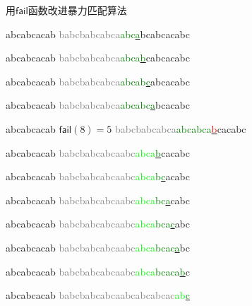 \documentclass{ctexbeamer}
\newcommand{\red}[1]{\textcolor{red}{#1}}
\newcommand{\green}[1]{\textcolor{green}{#1}}
\newcommand{\gray}[1]{\textcolor{gray}{#1}}
\newcommand{\lime}[1]{\textcolor{lime}{#1}}
\newcommand{\fail}{\mathsf{fail}}
\newcommand{\ugrn}[1]{\underline{\green{#1}}}
\newcommand{\ured}[1]{\underline{\red{#1}}}
\begin{document}
\begin{frame}[fragile]{用$\fail$函数改进暴力匹配算法}
\begin{minipage}[t]{0.33\textwidth}
\begin{tverb}[fontsize=\tiny]
            abcabcacab
\gray{babcbabcabca}\green{abc}\ugrn{a}bcabcacabc
\end{tverb}

\begin{tverb}[fontsize=\tiny]
            abcabcacab
\gray{babcbabcabca}\green{abca}\ugrn{b}cabcacabc
\end{tverb}

\begin{tverb}[fontsize=\tiny]
            abcabcacab
\gray{babcbabcabca}\green{abcab}\ugrn{c}abcacabc
\end{tverb}

\begin{tverb}[fontsize=\tiny]
            abcabcacab
\gray{babcbabcabca}\green{abcabc}\ugrn{a}bcacabc
\end{tverb}

\begin{tverb}[fontsize=\tiny]
            abcabcacab \(\scriptstyle\fail(8)=5\)
\gray{babcbabcabca}\green{abcabca}\ured{b}cacabc
\end{tverb}

\begin{tverb}[fontsize=\tiny]
               abcabcacab
\gray{babcbabcabcaabc}\lime{abca}\ugrn{b}cacabc
\end{tverb}

\end{minipage}%
%
\begin{minipage}[t]{.33\textwidth}

\begin{tverb}[fontsize=\tiny]
               abcabcacab
\gray{babcbabcabcaabc}\lime{abca}\green{b}\ugrn{c}acabc
\end{tverb}

\begin{tverb}[fontsize=\tiny]
               abcabcacab
\gray{babcbabcabcaabc}\lime{abca}\green{bc}\ugrn{a}cabc
\end{tverb}

\begin{tverb}[fontsize=\tiny]
               abcabcacab
\gray{babcbabcabcaabc}\lime{abca}\green{bca}\ugrn{c}abc
\end{tverb}

\begin{tverb}[fontsize=\tiny]
               abcabcacab
\gray{babcbabcabcaabc}\lime{abca}\green{bcac}\ugrn{a}bc
\end{tverb}

\begin{tverb}[fontsize=\tiny]
               abcabcacab
\gray{babcbabcabcaabc}\lime{abca}\green{bcaca}\ugrn{b}c
\end{tverb}

\begin{tverb}[fontsize=\tiny]
                       abcabcacab
\gray{babcbabcabcaabcabcabcac}\lime{ab}\ugrn{c}
\end{tverb}
\end{minipage}

\end{frame}
\end{document}

